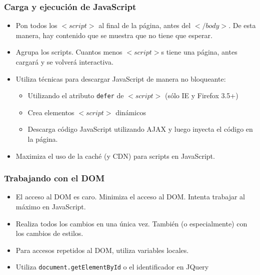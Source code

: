 \begin{frame}
\frametitle{Carga y ejecución de JavaScript}

\begin{itemize}
  \item Pon todos los $<script>$ al final de la página, antes del $</body>$. De esta manera, hay contenido que se muestra que no tiene que esperar.
  \item Agrupa los scripts. Cuantos menos $<script>$s tiene una página, antes cargará y se volverá interactiva. 
  \item Utiliza técnicas para descargar JavaScript de manera no bloqueante:
  \begin{itemize}
    \item Utilizando el atributo \texttt{defer} de $<script>$ (sólo IE y Firefox 3.5+)
    \item Crea elementos $<script>$ dinámicos
    \item Descarga código JavaScript utilizando AJAX y luego inyecta el código en la página.
  \end{itemize}
  \item Maximiza el uso de la caché (y CDN) para scripts en JavaScript.
\end{itemize}


\end{frame}


\begin{frame}
\frametitle{Trabajando con el DOM}

\begin{itemize}
  \item El acceso al DOM es caro. Minimiza el acceso al DOM. Intenta trabajar al máximo en JavaScript.
  \item Realiza todos los cambios en una única vez. También (o especialmente) con los cambios de estilos.
  \item Para accesos repetidos al DOM, utiliza variables locales.
  \item Utiliza \texttt{document.getElementById} o el identificador en JQuery
\end{itemize}

\end{frame}



